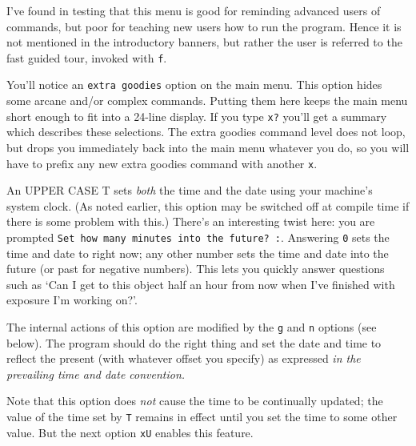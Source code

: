 I've found in testing that this menu is good for reminding
advanced users of commands, but poor for teaching new users
how to run the program.  Hence it is not mentioned in the
introductory banners, but rather the user is referred to the
fast guided tour, invoked with {\tt f}.


You'll notice an {\tt extra goodies} option on the main
menu.  This option hides some arcane and/or complex commands.
Putting them
here keeps the main menu short enough to fit into a 
24-line display.  If you
type {\tt x?} you'll get a summary which describes these
selections.  The extra goodies command level does not loop,
but drops you immediately back into the main
menu whatever you do, so you will have to prefix any new
extra goodies command with another {\tt x}.


An UPPER CASE T sets {\it both} the time and the date using your
machine's system clock.  (As noted earlier, this option 
may be switched off at compile time if there is some
problem with this.)  There's an interesting twist here:
you are prompted {\tt Set how many minutes into the future?  :}.
Answering {\tt 0} sets the time and date to right now;
any other number sets the time and date into the
future (or past for negative numbers).  This lets you 
quickly answer questions such
as  `Can I get to this object half an hour from now
when I've finished with exposure I'm working
on?'.

The internal actions of this option are modified by the
{\tt g} and {\tt n} options (see below).
The program should do the right thing and set
the date and time to reflect the present (with 
whatever offset you specify) as expressed {\it in the prevailing
time and date convention.}

Note that this option does {\it not} cause the time to be continually
updated; the value of the time set by {\tt T} remains in effect
until you set the time to some other value.  But the next option {\tt xU}
enables this feature.


